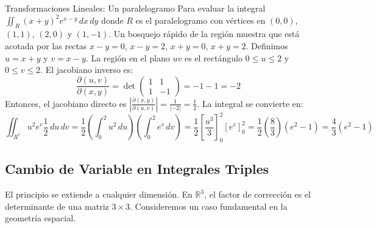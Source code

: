 \documentclass[11pt,a4paper]{article}
\begin{document}
\begin{ejemplobox}{Transformaciones Lineales: Un paralelogramo}
Para evaluar la integral $\iint_R (x+y)^2 e^{x-y} \, dx \, dy$ donde $R$ es el paralelogramo con vértices en $(0,0)$, $(1,1)$, $(2,0)$ y $(1,-1)$.
Un bosquejo rápido de la región muestra que está acotada por las rectas $x-y=0$, $x-y=2$, $x+y=0$, $x+y=2$.
Definimos $u = x+y$ y $v = x-y$. La región en el plano $uv$ es el rectángulo $0 \le u \le 2$ y $0 \le v \le 2$.
El jacobiano inverso es:
\begin{equation*}
\frac{\partial(u,v)}{\partial(x,y)} = \det \begin{pmatrix} 1 & 1 \\ 1 & -1 \end{pmatrix} = -1 - 1 = -2
\end{equation*}
Entonces, el jacobiano directo es $\left| \frac{\partial(x,y)}{\partial(u,v)} \right| = \frac{1}{|-2|} = \frac{1}{2}$.
La integral se convierte en:
\begin{equation*}
\iint_{R^*} u^2 e^v \frac{1}{2} \, du \, dv = \frac{1}{2} \left( \int_{0}^{2} u^2 \, du \right) \left( \int_{0}^{2} e^v \, dv \right) = \frac{1}{2} \left[ \frac{u^3}{3} \right]_0^2 \left[ e^v \right]_0^2 = \frac{1}{2} \left(\frac{8}{3}\right) (e^2 - 1) = \frac{4}{3}(e^2 - 1)
\end{equation*}
\end{ejemplobox}


\subsection*{Cambio de Variable en Integrales Triples}

El principio se extiende a cualquier dimensión. En $\mathbb{R}^3$, el factor de corrección es el determinante de una matriz $3 \times 3$. Consideremos un caso fundamental en la geometría espacial.
\end{document}
